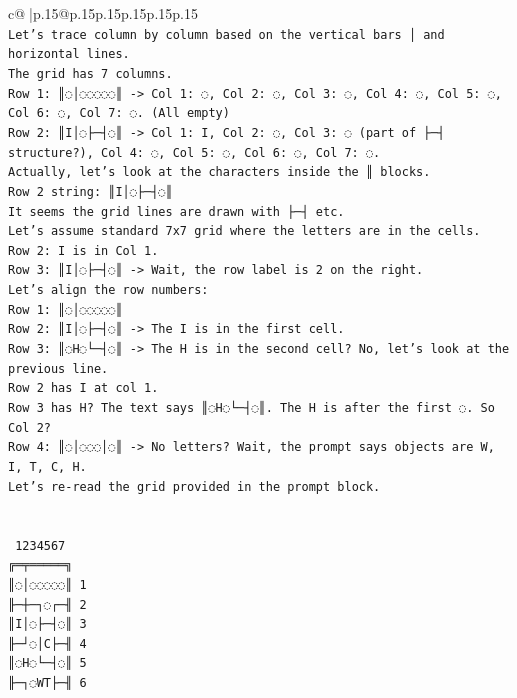 \documentclass{article}
\begin{document}
{\begin{supertabular}{c@{$\;$}|p{.15\linewidth}@{}p{.15\linewidth}p{.15\linewidth}p{.15\linewidth}p{.15\linewidth}p{.15\linewidth}}
{{{\\ 
\texttt{Let's trace column by column based on the vertical bars │ and horizontal lines.} \\
\texttt{The grid has 7 columns.} \\
\texttt{Row 1: ║◌│◌◌◌◌◌║ {-}> Col 1: ◌, Col 2: ◌, Col 3: ◌, Col 4: ◌, Col 5: ◌, Col 6: ◌, Col 7: ◌. (All empty)} \\
\texttt{Row 2: ║I│◌├─┤◌║ {-}> Col 1: I, Col 2: ◌, Col 3: ◌ (part of ├─┤ structure?), Col 4: ◌, Col 5: ◌, Col 6: ◌, Col 7: ◌.} \\
\texttt{Actually, let's look at the characters inside the ║ blocks.} \\
\texttt{Row 2 string: ║I│◌├─┤◌║} \\
\texttt{It seems the grid lines are drawn with ├─┤ etc.} \\
\texttt{Let's assume standard 7x7 grid where the letters are in the cells.} \\
\texttt{Row 2: I is in Col 1.} \\
\texttt{Row 3: ║I│◌├─┤◌║ {-}> Wait, the row label is 2 on the right.} \\
\texttt{Let's align the row numbers:} \\
\texttt{Row 1: ║◌│◌◌◌◌◌║} \\
\texttt{Row 2: ║I│◌├─┤◌║ {-}> The I is in the first cell.} \\
\texttt{Row 3: ║◌H◌└─┤◌║ {-}> The H is in the second cell? No, let's look at the previous line.} \\
\texttt{Row 2 has I at col 1.} \\
\texttt{Row 3 has H? The text says ║◌H◌└─┤◌║. The H is after the first ◌. So Col 2?} \\
\texttt{Row 4: ║◌│◌◌◌│◌║ {-}> No letters? Wait, the prompt says objects are W, I, T, C, H.} \\
\texttt{Let's re{-}read the grid provided in the prompt block.} \\
\\ 
\\ 
\texttt{ 1234567} \\
\texttt{╔═╤═════╗} \\
\texttt{║◌│◌◌◌◌◌║ 1} \\
\texttt{╟─┼─┐◌┌─╢ 2} \\
\texttt{║I│◌├─┤◌║ 3} \\
\texttt{╟─┘◌│C├─╢ 4} \\
\texttt{║◌H◌└─┤◌║ 5} \\
\texttt{╟─┐◌WT├─╢ 6} \\
}}}
\end{supertabular}}
\end{document}
